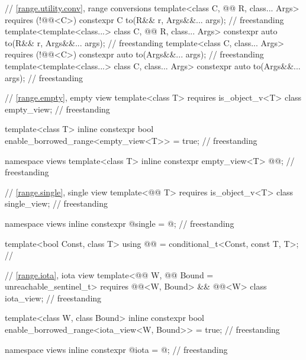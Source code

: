 \begin{codeblock}
{  // \ref{range.utility.conv}, range conversions
  template<class C, @@ R, class... Args> requires (!@@<C>)
    constexpr C to(R&& r, Args&&... args);                                          // freestanding
  template<template<class...> class C, @@ R, class... Args>
    constexpr auto to(R&& r, Args&&... args);                                       // freestanding
  template<class C, class... Args> requires (!@@<C>)
    constexpr auto to(Args&&... args);                                              // freestanding
  template<template<class...> class C, class... Args>
    constexpr auto to(Args&&... args);                                              // freestanding

  // \ref{range.empty}, empty view
  template<class T>
    requires is_object_v<T>
  class empty_view;                                                                 // freestanding

  template<class T>
    inline constexpr bool enable_borrowed_range<empty_view<T>> = true;              // freestanding

  namespace views {
    template<class T>
      inline constexpr empty_view<T> @@{};                                       // freestanding
  }

  // \ref{range.single}, single view
  template<@@ T>
    requires is_object_v<T>
  class single_view;                                                                // freestanding

  namespace views { inline constexpr @\unspecnc@ single = @\unspecnc@; }            // freestanding

  template<bool Const, class T>
    using @@ = conditional_t<Const, const T, T>;   // \expos

  // \ref{range.iota}, iota view
  template<@@ W, @@ Bound = unreachable_sentinel_t>
    requires @@<W, Bound> && @@<W>
  class iota_view;                                                                  // freestanding

  template<class W, class Bound>
    inline constexpr bool enable_borrowed_range<iota_view<W, Bound>> = true;        // freestanding

  namespace views { inline constexpr @\unspecnc@ iota = @\unspecnc@; }              // freestanding

}
\end{codeblock}
